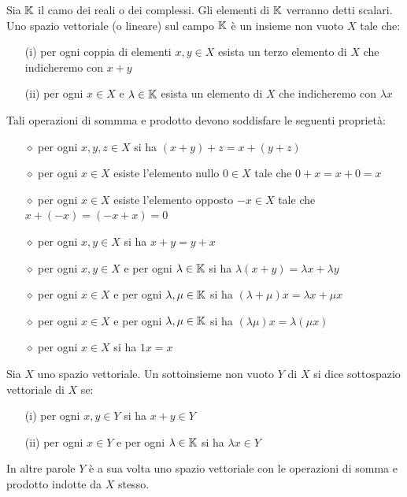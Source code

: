 \begin{defn}
Sia $\mathbb{K}$ il camo dei reali o dei complessi. Gli elementi di $\mathbb{K}$ verranno detti scalari. Uno spazio vettoriale (o lineare) sul campo $\mathbb{K}$ è un insieme non vuoto $X$ tale che:
\begin{enumerate}
    \item [(i)] per ogni coppia di elementi $x,y\in X$ esista un terzo elemento di $X$ che indicheremo con $x+y$
    \item [(ii)] per ogni $x\in X$ e $\lambda \in \mathbb{K}$ esista un elemento di $X$ che indicheremo con $\lambda x$
\end{enumerate}
Tali operazioni di sommma e prodotto devono soddisfare le seguenti proprietà:
\begin{enumerate}
    \item [$\diamond$] per ogni $x,y,z\in X$ si ha $(x+y)+z=x+(y+z)$
    \item [$\diamond$] per ogni $x\in X$ esiste l'elemento nullo $0\in X$ tale che $0+x=x+0=x$
    \item [$\diamond$] per ogni $x\in X$ esiste l'elemento opposto $-x\in X$ tale che $x+(-x)=(-x+x)=0$
    \item [$\diamond$] per ogni $x,y\in X$ si ha $x+y=y+x$
    \item [$\diamond$] per ogni $x,y\in X$ e per ogni $\lambda\in\mathbb{K}$ si ha $\lambda(x+y)=\lambda x+\lambda y$
    \item [$\diamond$] per ogni $x\in X$ e per ogni $\lambda,\mu\in\mathbb{K}$ si ha $(\lambda+\mu)x=\lambda x +\mu x$
    \item [$\diamond$] per ogni $x\in X$ e per ogni $\lambda,\mu\in\mathbb{K}$ si ha $(\lambda \mu)x=\lambda(\mu x)$
    \item [$\diamond$] per ogni $x\in X$ si ha $1x=x$
\end{enumerate}
\end{defn}

\begin{defn}
Sia $X$ uno spazio vettoriale. Un sottoinsieme non vuoto $Y$ di $X$ si dice sottospazio vettoriale di $X$ se:
\begin{enumerate}
    \item [(i)] per ogni $x,y\in Y$ si ha $x+y\in Y$
    \item [(ii)] per ogni $x\in Y$ e per ogni $\lambda\in\mathbb{K}$ si ha $\lambda x\in Y$
\end{enumerate}
\end{defn}
In altre parole $Y$ è a sua volta uno spazio vettoriale con le operazioni di somma e prodotto indotte da $X$ stesso.

